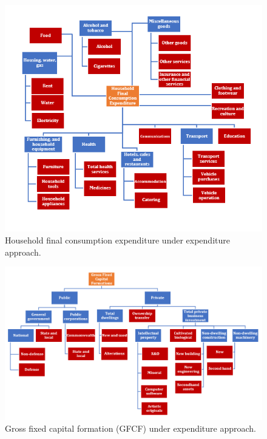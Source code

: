 \documentclass[graybox]{svmult}
\begin{document}
\begin{figure}[H]
	\centering
	\small
	\includegraphics[scale=1]{Figs/GDP_E_fig2.PNG}
	\caption{Household final consumption expenditure under expenditure approach.}\label{GDP_E_fig2}
\end{figure}

\begin{figure}[H]
	\centering
	\small
	\includegraphics[scale=0.65]{Figs/GDP_E_fig3.PNG}
	\caption{Gross fixed capital formation (GFCF) under expenditure approach.}\label{GDP_E_fig3}
\end{figure}
\end{document}
